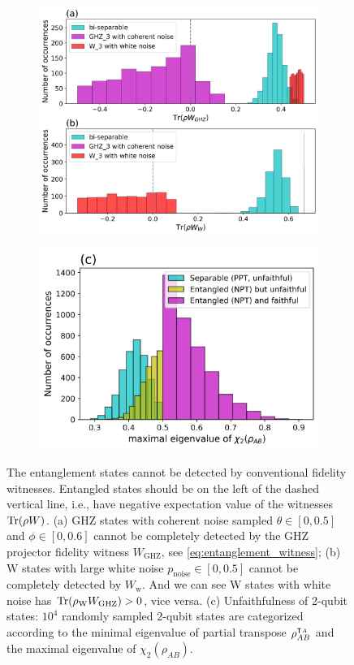 \documentclass[
aps,
pra,
twocolumn,
floatfix,
]{revtex4-2}
\theoremstyle{plain}
\theoremstyle{definition}
\newcommand{\ew}{W}
\newcommand{\dm}{\rho}
\newcommand{\ghz}{\text{GHZ}}
\newcommand{\noise}{\text{noise}}
\begin{document}
\begin{figure}[!ht]
	\centering
		\begin{subfigure}{0.49\textwidth}
		\centering
			\includegraphics[width=.9\linewidth]{./Code/fidelity_witness_compare_2_long.png}
		\end{subfigure}
		\begin{subfigure}{0.45\textwidth}
		\centering
			\includegraphics[width=.9\linewidth]{./Code/faithfulness_2_qubit.png}
		\end{subfigure}
	\caption{The entanglement states cannot be detected by conventional fidelity witnesses. Entangled states should be on the left of the dashed vertical line, i.e., have negative expectation value of the witnesses $\Tr(\dm\ew)$. (a) GHZ states with coherent noise sampled $\theta\in[0,0.5]$ and $\phi\in[0,0.6]$ cannot be completely detected by the GHZ projector fidelity witness $W_{\ghz}$, see \cref{eq:entanglement_witness}; (b) W states with large white noise $p_{\noise}\in[0,0.5]$ cannot be completely detected by $W_{\text{w}}$. And we can see W states with white noise has $\Tr(\dm_{\text{W}}\ew_{\ghz})>0$, vice versa. (c) Unfaithfulness of 2-qubit states: $10^4$ randomly sampled 2-qubit states are categorized according to the minimal eigenvalue of partial transpose $\dm_{AB}^{\T_A}$ and the maximal eigenvalue of $\chi_2(\dm_{AB})$.}
	\label{fig:conventional_witness}
\end{figure}
\end{document}
